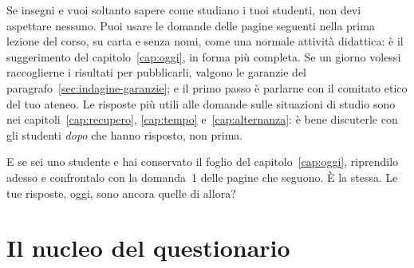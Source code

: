 Se insegni e vuoi soltanto sapere come studiano i tuoi studenti, non
devi aspettare nessuno. Puoi usare le domande delle pagine seguenti
nella prima lezione del corso, su carta e senza nomi, come una normale
attività didattica: è il suggerimento del capitolo~\ref{cap:oggi}, in
forma più completa. Se un giorno volessi raccoglierne i risultati per
pubblicarli, valgono le garanzie del
paragrafo~\ref{sec:indagine-garanzie}; e il primo passo è parlarne con
il comitato etico del tuo ateneo. Le risposte più utili alle domande
sulle situazioni di studio sono nei capitoli~\ref{cap:recupero},
\ref{cap:tempo} e~\ref{cap:alternanza}: è bene discuterle con gli
studenti \emph{dopo} che hanno risposto, non prima.

E se sei uno studente e hai conservato il foglio del
capitolo~\ref{cap:oggi}, riprendilo adesso e confrontalo con la
domanda~1 delle pagine che seguono. È la stessa. Le tue risposte, oggi,
sono ancora quelle di allora?

\clearpage\raggedbottom
\section{Il nucleo del questionario}
\label{sec:indagine-nucleo}

